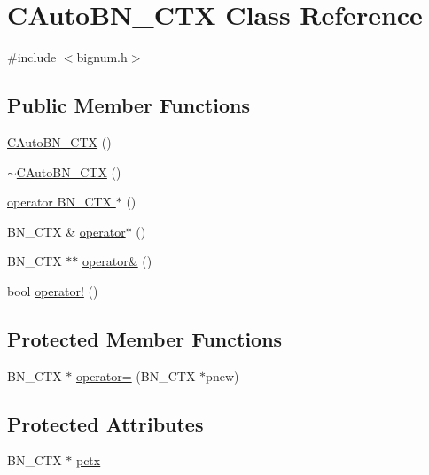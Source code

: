 \hypertarget{class_c_auto_b_n___c_t_x}{}\section{C\+Auto\+B\+N\+\_\+\+C\+T\+X Class Reference}
\label{class_c_auto_b_n___c_t_x}


{\ttfamily \#include $<$bignum.\+h$>$}

\subsection*{Public Member Functions}
\begin{DoxyCompactItemize}
\item 
\hyperlink{class_c_auto_b_n___c_t_x_a0ef12d97d8825efa9ee75537936217c5}{C\+Auto\+B\+N\+\_\+\+C\+T\+X} ()
\item 
\hyperlink{class_c_auto_b_n___c_t_x_a5de213d9beb6b3f40e78d8b90a0724e1}{$\sim$\+C\+Auto\+B\+N\+\_\+\+C\+T\+X} ()
\item 
\hyperlink{class_c_auto_b_n___c_t_x_a17f28434d1ddfb3133ba34aaa73d44b4}{operator B\+N\+\_\+\+C\+T\+X $\ast$} ()
\item 
B\+N\+\_\+\+C\+T\+X \& \hyperlink{class_c_auto_b_n___c_t_x_a3850675de213c20d764575850a37ddfd}{operator$\ast$} ()
\item 
B\+N\+\_\+\+C\+T\+X $\ast$$\ast$ \hyperlink{class_c_auto_b_n___c_t_x_a907fba2d67e3cf22531b53131c3ce38b}{operator\&} ()
\item 
bool \hyperlink{class_c_auto_b_n___c_t_x_a33c967d143efcbfafcac9f863fce1d4f}{operator!} ()
\end{DoxyCompactItemize}
\subsection*{Protected Member Functions}
\begin{DoxyCompactItemize}
\item 
B\+N\+\_\+\+C\+T\+X $\ast$ \hyperlink{class_c_auto_b_n___c_t_x_a954a9a333d2041861500e5cb471fa8f6}{operator=} (B\+N\+\_\+\+C\+T\+X $\ast$pnew)
\end{DoxyCompactItemize}
\subsection*{Protected Attributes}
\begin{DoxyCompactItemize}
\item 
B\+N\+\_\+\+C\+T\+X $\ast$ \hyperlink{class_c_auto_b_n___c_t_x_a264ef42b71cb55111928fce1aa4d9ad3}{pctx}
\end{DoxyCompactItemize}


